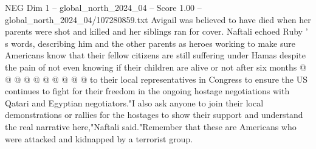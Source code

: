 \begin{textsample}{NEG Dim 1 – global\_north\_2024\_04 – Score 1.00 – global\_north\_2024\_04/107280859.txt}
Avigail was believed to have died when her parents were shot and killed and her siblings ran for cover.
Naftali echoed Ruby ' s words, describing him and the other parents as heroes working to make sure Americans know that their fellow citizens are still suffering under Hamas despite the pain of not even knowing if their children are alive or not after six months @ @ @ @ @ @ @ @ @ @ to their local representatives in Congress to ensure the US continues to fight for their freedom in the ongoing hostage negotiations with Qatari and Egyptian negotiators."I also ask anyone to join their local demonstrations or rallies for the hostages to show their support and understand the real narrative here,"Naftali said."Remember that these are Americans who were attacked and kidnapped by a terrorist group.

\end{textsample}
